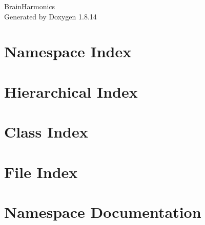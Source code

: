 \documentclass[twoside]{book}
\newcommand{\+}{\discretionary{\mbox{\scriptsize$\hookleftarrow$}}{}{}}
\newcommand{\clearemptydoublepage}{%
  \newpage{\pagestyle{empty}\cleardoublepage}%
}
\begin{document}
\hypersetup{pageanchor=false,
             bookmarksnumbered=true,
             pdfencoding=unicode
            }
\begin{titlepage}
\vspace*{7cm}
\begin{center}%
{\Large Brain\+Harmonics }\\
\vspace*{1cm}
{\large Generated by Doxygen 1.8.14}\\
\end{center}
\end{titlepage}
\clearemptydoublepage
{}
\tableofcontents
\clearemptydoublepage
{}
\hypersetup{pageanchor=true}

\chapter{Namespace Index}

\chapter{Hierarchical Index}

\chapter{Class Index}

\chapter{File Index}

\chapter{Namespace Documentation}


\end{document}
